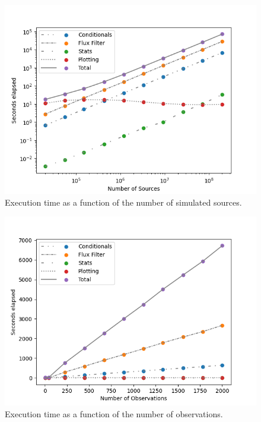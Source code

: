 \documentclass[12pt]{article}
\begin{document}
 \begin{figure}
\includegraphics[width=\columnwidth]{figure10.png}
\caption{Execution time as a function of the number of simulated sources.}
\label{fig10}
 \end{figure}
 
  \begin{figure}
\includegraphics[width=\columnwidth]{figure11.png}
\caption{Execution time as a function of the number of observations.}
\label{fig11}
 \end{figure}
% 
\end{document}
